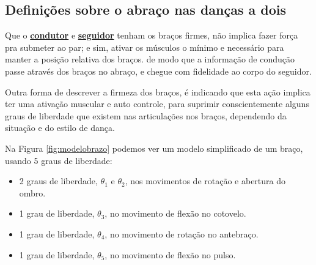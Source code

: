 \subsection{Definições sobre o abraço nas danças a dois}

\begin{definition}
\label{def:brazosfirmes} 
Que o \hyperref[def:Condutor]{\textbf{condutor}} e \hyperref[def:Seguidor]{\textbf{seguidor}}
tenham os braços firmes, não implica fazer força pra submeter ao par;
e sim, ativar os músculos o mínimo e necessário para manter a posição relativa dos braços.
de modo que a informação de condução passe através dos braços no abraço, 
e chegue com fidelidade ao corpo do seguidor.

Outra forma de descrever a firmeza dos braços, 
é indicando que esta ação implica ter uma ativação muscular e auto controle, 
para suprimir conscientemente alguns graus de liberdade que existem nas articulações nos braços, 
dependendo da situação e do estilo de dança.
\end{definition}




Na Figura \ref{fig:modelobrazo} podemos ver um modelo simplificado de um braço,
usando 5 graus de liberdade:
\begin{itemize}
\item 2 graus de liberdade, $\theta_1$ e $\theta_2$, nos movimentos de rotação e abertura do ombro.
\item 1 grau de liberdade, $\theta_3$, no movimento de flexão no cotovelo.
\item 1 grau de liberdade, $\theta_4$, no movimento de rotação no antebraço.
\item 1 grau de liberdade, $\theta_5$, no movimento de flexão no pulso.
\end{itemize}

 

